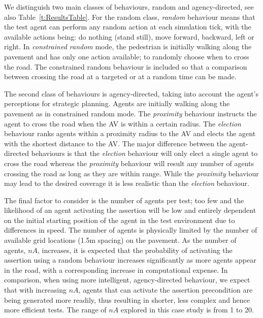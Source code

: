 \documentclass[letterpaper, 10 pt, journal, twoside]{IEEEtran}
\begin{document}
We distinguish two main classes of behaviours, random and agency-directed, see also Table~\ref{t:ResultsTable}. For the random class, \textit{random} behaviour means that the test agent can perform any random action at each simulation tick, with the available actions being: do nothing (stand still), move forward, backward, left or right. In \textit{constrained random} mode, the pedestrian is initially walking along the pavement and has only one action available; to randomly choose when to cross the road. The constrained random behaviour is included so that a comparison between crossing the road at a targeted or at a random time can be made. 

The second class of behaviours is agency-directed, taking into account the agent's perceptions for strategic planning. Agents are initially walking along the pavement as in constrained random mode. The \textit{proximity} behaviour instructs the agent to cross the road when the AV is within a certain radius. The \textit{election} behaviour ranks agents within a proximity radius to the AV and elects the agent with the shortest distance to the AV. The major difference between the agent-directed behaviours is that the \textit{election} behaviour will only elect a single agent to cross the road whereas the \textit{proximity} behaviour will result any number of agents crossing the road as long as they are within range.
%
While the \textit{proximity} behaviour may lead to the desired coverage it is less realistic than the \textit{election} behaviour. 
%
%

The final factor to consider is the number of agents per test; too few and the likelihood of an agent activating the assertion will be low and entirely dependent on the initial starting position of the agent in the test environment due to differences in speed. The number of agents is physically limited by the number of available grid locations (1.5m spacing) on the pavement. %
%
As the number of agents, $nA$, increases, it is expected that the probability of activating the assertion using a random behaviour increases significantly as more agents appear in the road, with a corresponding increase in computational expense. 
%
In comparison, when using more intelligent, agency-directed behaviour, we expect that with increasing $nA$, agents that can activate the assertion precondition are being generated more readily, thus resulting in shorter, less complex and hence more efficient tests. The range of $nA$ explored in this case study is from 1 to 20.
\end{document}
